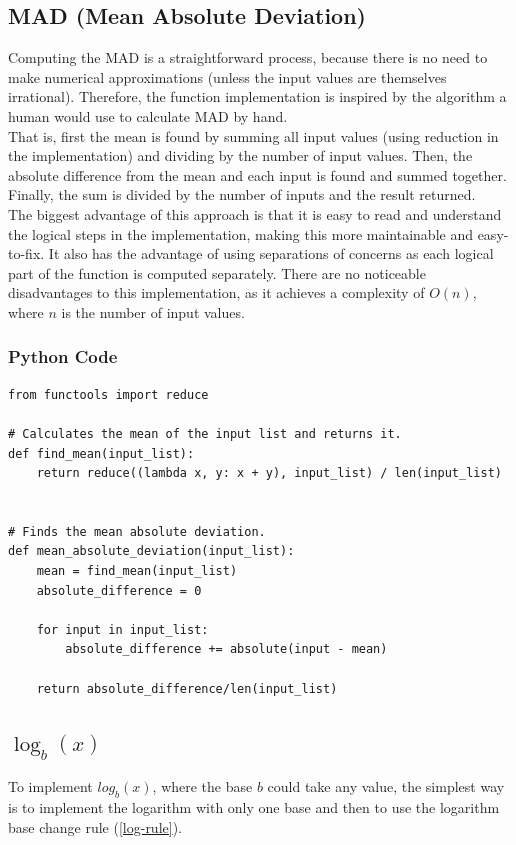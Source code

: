 \documentclass[11pt,onside]{report}
\begin{document}
\subsection{MAD (Mean Absolute Deviation)}
Computing the MAD is a straightforward process, because there is no need to make numerical approximations (unless the input values are themselves irrational). Therefore, the function implementation is inspired by the algorithm a human would use to calculate MAD by hand. \\

That is, first the mean is found by summing all input values (using reduction in the implementation) and dividing by the number of input values. Then, the absolute difference from the mean and each input is found and summed together. Finally, the sum is divided by the number of inputs and the result returned. \\

The biggest advantage of this approach is that it is easy to read and understand the logical steps in the implementation, making this more maintainable and easy-to-fix. It also has the advantage of using separations of concerns as each logical part of the function is computed separately. There are no noticeable disadvantages to this implementation, as it achieves a complexity of $O(n)$, where $n$ is the number of input values.

\subsubsection{Python Code}
\begin{lstlisting}
from functools import reduce

# Calculates the mean of the input list and returns it.
def find_mean(input_list):
	return reduce((lambda x, y: x + y), input_list) / len(input_list)


# Finds the mean absolute deviation.
def mean_absolute_deviation(input_list):
	mean = find_mean(input_list)
	absolute_difference = 0
	
	for input in input_list:
		absolute_difference += absolute(input - mean)
		
	return absolute_difference/len(input_list)
\end{lstlisting}

\subsection{$\log_b(x)$}
To implement $log_b(x)$, where the base $b$ could take any value, the simplest way is to implement the logarithm with only one base and then to use the logarithm base change rule (\ref{log-rule}).
\end{document}
